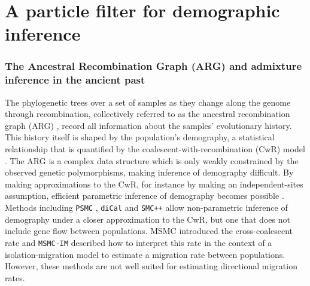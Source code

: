 

\chapter{A particle filter for demographic inference} \label{ch:smc2}

\subsection{The Ancestral Recombination Graph (ARG) and admixture inference in the ancient past}


The phylogenetic trees over a set of samples as they change along the genome through recombination, collectively referred to as the ancestral recombination graph (ARG) \cite{Griffiths1997a,Rasmussen2014}, record all information about the samples' evolutionary history.  This history itself is shaped by the population's demography, a statistical relationship that is quantified by the coalescent-with-recombination (CwR) model \cite{Griffiths1997a}.  The ARG is a complex data structure which is only weakly constrained by the observed genetic polymorphisms, making inference of demography difficult. By making approximations to the CwR, for instance by making an independent-sites assumption, efficient parametric inference of demography becomes possible \cite{Excoffier2013,McVean2005}.  Methods including {\tt PSMC} \cite{Li2011}, {\tt diCal} \cite{Steinrucken2015} and {\tt SMC++} \cite{Terhorst2015} allow non-parametric inference of demography under a closer approximation to the CwR, but one that does not include gene flow between populations. MSMC \cite{Schiffels2014} introduced the cross-coalescent rate and {\tt MSMC-IM} described how to interpret this rate in the context of a isolation-migration model to estimate a migration rate between populations\cite{Wang2019a}. However, these methods are not well suited for estimating directional migration rates. 

